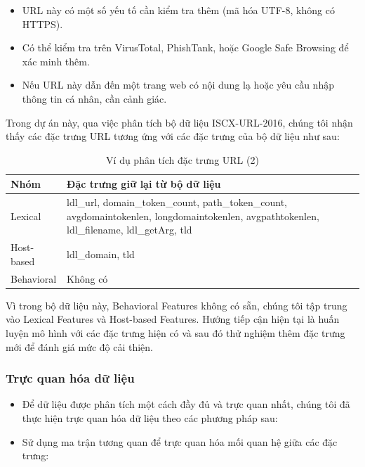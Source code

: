 \documentclass[13pt]{article}
\begin{document}
\begin{itemize}
    \item URL này có một số yếu tố cần kiểm tra thêm (mã hóa UTF-8, không có HTTPS).
    \item Có thể kiểm tra trên VirusTotal, PhishTank, hoặc Google Safe Browsing để xác minh thêm.
    \item Nếu URL này dẫn đến một trang web có nội dung lạ hoặc yêu cầu nhập thông tin cá nhân, cần cảnh giác.
\end{itemize}

Trong dự án này, qua việc phân tích bộ dữ liệu ISCX-URL-2016, chúng tôi nhận thấy các đặc trưng URL tương ứng với các đặc trưng của bộ dữ liệu như sau:

\newpage
\begin{table}[]
    \centering
    \renewcommand{\arraystretch}{1.3} %
    \begin{tabular}{|p{3cm}|p{5cm}|}
    \hline
    \rowcolor[HTML]{A9CCE3} %
    \textbf{Nhóm} & \textbf{Đặc trưng giữ lại từ bộ dữ liệu}\\
    \hline
    Lexical & ldl\_url, domain\_token\_count, path\_token\_count, avgdomaintokenlen, longdomaintokenlen, avgpathtokenlen, ldl\_filename, ldl\_getArg, tld \\
    \hline
    Host-based & ldl\_domain, tld\\
    \hline
    Behavioral & Không có\\
    \hline
    \end{tabular}
    \caption{Ví dụ phân tích đặc trưng URL (2)}
    \label{tab:my_label}
\end{table}

Vì trong bộ dữ liệu này, Behavioral Features không có sẵn, chúng tôi tập trung vào Lexical Features và Host-based Features. Hướng tiếp cận hiện tại là huấn luyện mô hình với các đặc trưng hiện có và sau đó thử nghiệm thêm đặc trưng mới để đánh giá mức độ cải thiện.

\subsubsection{Trực quan hóa dữ liệu}
\begin{itemize}
    \item Để dữ liệu được phân tích một cách đầy đủ và trực quan nhất, chúng tôi đã thực hiện trực quan hóa dữ liệu theo các phương pháp sau:
    \item Sử dụng ma trận tương quan để trực quan hóa mối quan hệ giữa các đặc trưng:
\end{itemize}
\end{document}

